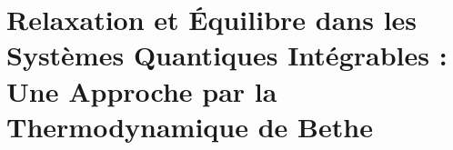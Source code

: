 \chapter{Relaxation et Équilibre dans les Systèmes Quantiques Intégrables : Une Approche par la Thermodynamique de Bethe}\label{chap:relaxation}
\minitoc
%






%


%

%


%



